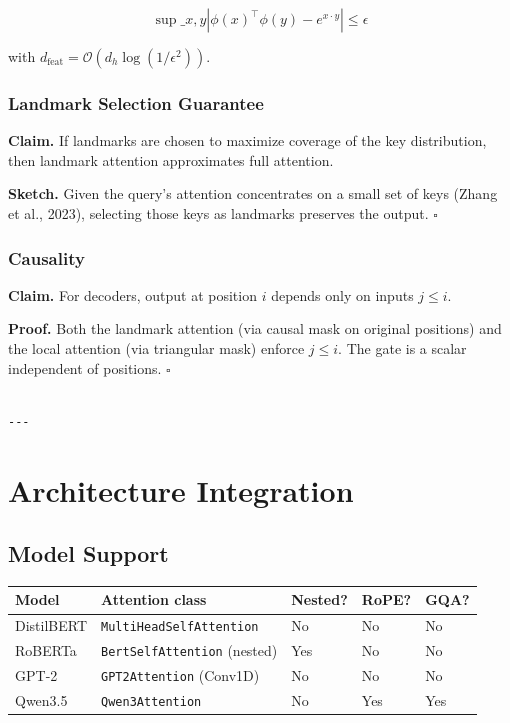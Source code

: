 \[
\sup\_{x, y} |\phi(x)^\top \phi(y) - e^{x \cdot y}| \leq \epsilon
\tag{4.17}
\]

with $d_\text{feat} = \mathcal{O}(d_h \log(1/\epsilon^2))$.

\subsubsection{Landmark Selection Guarantee}

\textbf{Claim.} If landmarks are chosen to maximize coverage of the key 
distribution, then landmark attention approximates full attention.

\textbf{Sketch.} Given the query's attention concentrates on a small set of 
keys (Zhang et al., 2023), selecting those keys as landmarks preserves 
the output. $\square$

\subsubsection{Causality}

\textbf{Claim.} For decoders, output at position $i$ depends only on inputs 
$j \leq i$.

\textbf{Proof.} Both the landmark attention (via causal mask on original 
positions) and the local attention (via triangular mask) enforce $j \leq i$. 
The gate is a scalar independent of positions. $\square$
\begin{lstlisting}

---
\end{lstlisting}

\section{Architecture Integration}

\subsection{Model Support}

\begin{table}[H]
\centering
\small
\begin{tabular}{lllll}
\toprule
\textbf{Model} & \textbf{Attention class} & \textbf{Nested?} & \textbf{RoPE?} & \textbf{GQA?} \\
\midrule
DistilBERT & \texttt{MultiHeadSelfAttention} & No & No & No \\
RoBERTa & \texttt{BertSelfAttention} (nested) & Yes & No & No \\
GPT-2 & \texttt{GPT2Attention} (Conv1D) & No & No & No \\
Qwen3.5 & \texttt{Qwen3Attention} & No & Yes & Yes \\
\bottomrule
\end{tabular}
\end{table}

